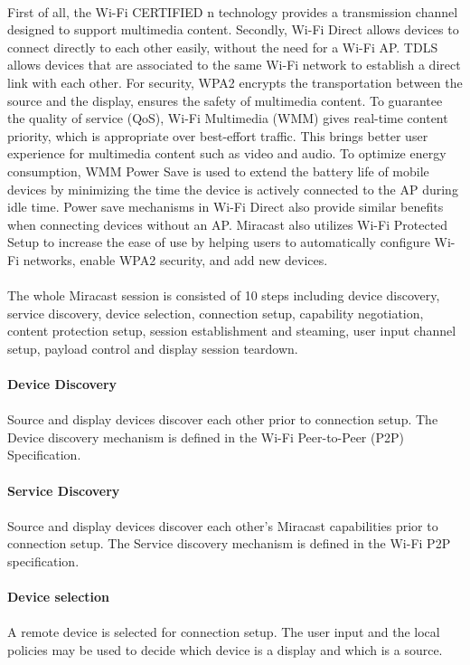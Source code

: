 \\
First of all, the Wi-Fi CERTIFIED n technology provides a transmission channel
designed to support multimedia content. Secondly, Wi-Fi Direct allows devices to
connect directly to each other easily, without the need for a Wi-Fi AP. TDLS
allows devices that are associated to the same Wi-Fi network to establish a
direct link with each other. For security, WPA2 encrypts the transportation
between the source and the display, ensures the safety of multimedia content. To
guarantee the quality of service (QoS), Wi-Fi Multimedia (WMM) gives real-time
content priority, which is appropriate over best-effort traffic. This brings
better user experience for multimedia content such as video and audio. To
optimize energy consumption, WMM Power Save is used to extend the battery life
of mobile devices by minimizing the time the device is actively connected to
the AP during idle time. Power save mechanisms in Wi-Fi Direct also provide
similar benefits when connecting devices without an AP. Miracast also utilizes 
Wi-Fi Protected Setup to increase the ease of use by helping users to
automatically configure Wi-Fi networks, enable WPA2 security, and add new
devices.\\
\\
The whole Miracast session is consisted of 10 steps including device discovery,
service discovery, device selection, connection setup, capability negotiation,
content protection setup, session establishment and steaming, user input
channel setup, payload control and display session teardown.\\
\\
\textbf{Device Discovery}\\
\\
Source and display devices discover each other prior to connection setup. The Device discovery mechanism is defined in the Wi-Fi Peer-to-Peer (P2P) Specification. \\
\\
\textbf{Service Discovery}\\
\\
Source and display devices discover each other's Miracast capabilities prior to connection setup. The Service discovery mechanism is defined in the Wi-Fi P2P specification. \\
\\
\textbf{Device selection}\\
\\
A remote device is selected for connection setup. The user input and the local policies may be used to decide which device is a display and which is a source. \\
